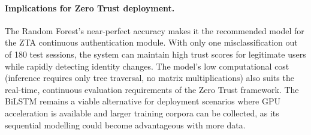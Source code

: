 \paragraph{Implications for Zero Trust deployment.}
The Random Forest's near-perfect accuracy makes it the recommended model for the ZTA continuous authentication module. With only one misclassification out of 180 test sessions, the system can maintain high trust scores for legitimate users while rapidly detecting identity changes. The model's low computational cost (inference requires only tree traversal, no matrix multiplications) also suits the real-time, continuous evaluation requirements of the Zero Trust framework. The BiLSTM remains a viable alternative for deployment scenarios where GPU acceleration is available and larger training corpora can be collected, as its sequential modelling could become advantageous with more data.
